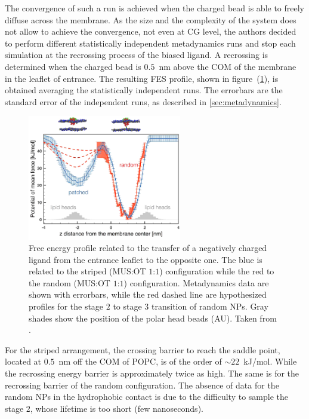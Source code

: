 The convergence of such a run is achieved when the charged bead is able to freely diffuse across 
the membrane. As the size and the complexity of the system does not allow to achieve the convergence, not even at 
\ac{CG} level, the authors decided to perform different statistically independent metadynamics runs and stop each 
simulation at the recrossing process of the biased ligand. A recrossing is determined when the charged bead is 
$0.5$~nm above the \ac{COM} of the membrane in the leaflet of entrance. The resulting \ac{FES} profile, shown in 
figure~(\ref{fig:NPFES}), is obtained averaging the statistically independent runs. The errorbars are the 
standard error of the independent runs, as described in \ref{sec:metadynamics}.
\begin{figure}[!th]
	\centering
	\includegraphics[width=0.6\textwidth]{./img/NPFES}
	\caption{Free energy profile related to the transfer of a negatively charged ligand from the entrance leaflet to the opposite one. The blue is related to the striped (\ac{MUS}:\ac{OT} $1$:$1$) configuration while the red to the random (\ac{MUS}:\ac{OT} $1$:$1$) configuration. Metadynamics data are shown with errorbars, while the red dashed line are hypothesized profiles for the stage $2$ to stage $3$ transition of random \acp{NP}. Gray shades show the position of the polar head beads (AU). Taken from \cite{ourPaper}.}
	\label{fig:NPFES}
\end{figure}

For the striped arrangement, the crossing barrier to reach the saddle point, located at $0.5$~nm off the \ac{COM} 
of \ac{POPC}, is of the order of $\sim 22$~kJ/mol. While the recrossing energy barrier is approximately twice as 
high. The same is for the recrossing barrier of the random configuration. The absence of data for the random 
\acp{NP} in the hydrophobic contact is due to the difficulty to sample the stage $2$, whose lifetime is too short 
(few nanoseconds).

